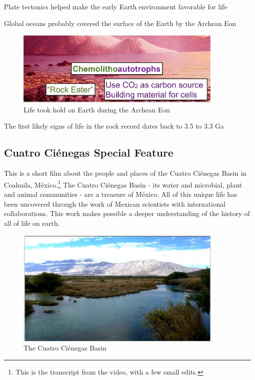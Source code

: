 \documentclass[]{article}
\begin{document}
Plate tectonics helped make the early Earth environment favorable for life

Global oceans probably covered the surface of the Earth by the Archean Eon

\begin{figure}[h!]
	\caption{Life took hold on Earth during the Archean Eon} 
	\includegraphics[width=0.9\textwidth]{Chemolithoautotrophs}
\end{figure}

The first likely signs of life in the rock record dates back to 3.5 to 3.3 Ga

\subsection{Cuatro Ci\'enegas Special Feature}

This is a short film about the people and places of the Cuatro Ci\'enegas Basin in Coahuila, M\'exico.\footnote{This is the transcript from the video, with a few small edits.} The Cuatro Ci\'enegas Basin - its water and microbial, plant and animal communities -
are a treasure of M\'exico. All of this unique life has been uncovered through the work of Mexican scientists with international collaborations. This work makes possible a deeper understanding of the history of all of life on earth.

\begin{figure}[h!]
	\caption{The Cuatro Ci\'enegas Basin} 
	\includegraphics[width=0.9\textwidth]{CuatroCienegas1}
\end{figure}
\end{document}
